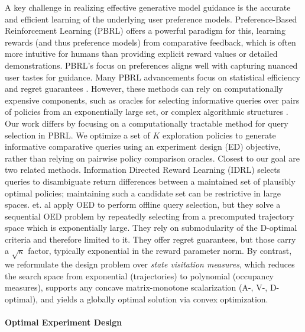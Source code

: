 \documentclass{article}
\begin{document}
A key challenge in realizing effective generative model guidance is the accurate and efficient learning of the underlying user preference models. Preference-Based Reinforcement Learning (PBRL) offers a powerful paradigm for this, learning rewards (and thus preference models) from comparative feedback, which is often more intuitive for humans than providing explicit reward values or detailed demonstrations. PBRL's focus on preferences aligns well with capturing nuanced user tastes for guidance. Many PBRL advancements focus on statistical efficiency and regret guarantees \cite{pmlr-v162-chen22ag, DBLP:journals/corr/abs-2111-04850, zhan2023provable, DBLP:journals/corr/abs-2111-04850}. However, these methods can rely on computationally expensive components, such as oracles for selecting informative queries over pairs of policies from an exponentially large set, or complex algorithmic structures \cite{wu2023making}. Our work differs by focusing on a computationally tractable method for query selection in PBRL. We optimize a set of $K$ exploration policies to generate informative comparative queries using an experiment design (ED) objective, rather than relying on pairwise policy comparison oracles. Closest to our goal are two related methods. Information Directed Reward Learning (IDRL) \cite{NEURIPS2021_1fa6269f} selects queries to disambiguate return differences between a maintained set of plausibly optimal policies; maintaining such a candidate set can be restrictive in large spaces. \citet{schlaginhaufen2025efficient} et. al apply OED to perform offline query selection, but they solve a sequential OED problem by repeatedly selecting from a precomputed trajectory space which is exponentially large. They rely on submodularity of the D-optimal criteria and therefore limited to it. They offer regret guarantees, but those carry a $\sqrt{\kappa}$ factor, typically exponential in the reward parameter norm. By contrast, we reformulate the design problem over \emph{state visitation measures}, which reduces the search space from exponential (trajectories) to polynomial (occupancy measures), supports any concave matrix-monotone scalarization (A-, V-, D-optimal), and yields a globally optimal solution via convex optimization.
\vspace{-0.2cm} \paragraph{Optimal Experiment Design} 
\end{document}
